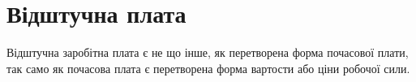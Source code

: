 \section{Відштучна плата}

Відштучна заробітна плата є не що інше, як перетворена
форма почасової плати, так само як почасова плата є перетворена
форма вартости або ціни робочої сили.
